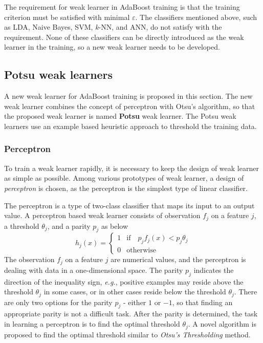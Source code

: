 The requirement for weak learner in AdaBoost training is that the training criterion must be satisfied with minimal $\varepsilon$. The classifiers mentioned above, such as LDA, Naive Bayes, SVM, \textit{k}-NN, and ANN, do not satisfy with the requirement. None of these classifiers can be directly introduced as the weak learner in the training, so a new weak learner needs to be developed.

\subsection{Potsu weak learners}
A new weak learner for AdaBoost training is proposed in this section. The new weak learner combines the concept of perceptron with Otsu's algorithm, so that the proposed weak learner is named \textbf{Potsu} weak learner. The Potsu weak learners use an example based heuristic approach to threshold the training data.

\subsubsection{Perceptron}
To train a weak learner rapidly, it is necessary to keep the design of weak learner as simple as possible. Among various prototypes of weak learner, a design of \textit{perceptron} \cite{Gallant1990} is chosen, as the perceptron is the simplest type of linear classifier.

The perceptron is a type of two-class classifier that maps its input to an output value. A perceptron based weak learner consists of observation $f_{j}$ on a feature $j$, a threshold $\theta_{j}$, and a parity $p_{j}$ as below
\begin{equation}
 h_{j}(x)=\left\{
		 \begin{array}{ll}
		  1 & \textrm{if} \quad p_{j}f_{j}(x)<p_{j}\theta_{j}\\
		  0 & \textrm{otherwise}
		 \end{array}
		\right. 
\label{eq:perceptron}
\end{equation}
The observation $f_{j}$ on a feature $j$ are numerical values, and the perceptron is dealing with data in a one-dimensional space. The parity $p_{j}$ indicates the direction of the inequality sign, \textit{e.g.}, positive examples may reside above the threshold $\theta_{j}$ in some cases, or in other cases reside below the threshold $\theta_{j}$. There are only two options for the parity $p_{j}$ - either $1$ or $-1$, so that finding an appropriate parity is not a difficult task. After the parity is determined, the task in learning a perceptron is to find the optimal threshold $\theta_{j}$. A novel algorithm is proposed to find the optimal threshold similar to \textit{Otsu's Thresholding} method.

